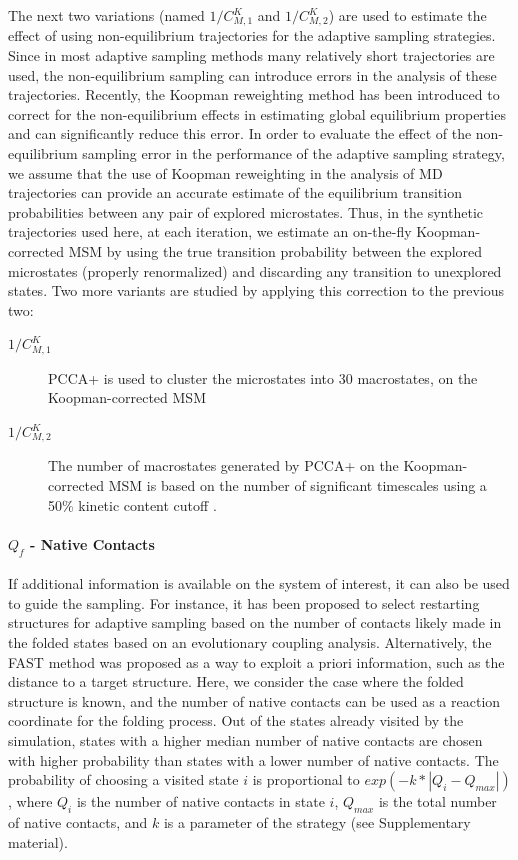 The next two variations (named $1/C_{M,1}^K$ and $1/C_{M,2}^K$) are used to
estimate the effect of using non-equilibrium trajectories for the adaptive sampling
strategies. Since in most adaptive sampling methods many relatively short
trajectories are used, the non-equilibrium sampling can introduce errors in the
analysis of these trajectories.
Recently, the Koopman reweighting method
\cite{koopmanold, koopman2,koopman3,koopman4, wu2017variational, Nueske2017} has been
introduced to correct for the non-equilibrium effects in estimating global
equilibrium properties and can significantly reduce this error. In order to
evaluate the effect of the non-equilibrium sampling error in the performance of
the adaptive sampling strategy, we assume that the use of Koopman reweighting
in the analysis of MD trajectories can provide an accurate estimate of the
equilibrium transition probabilities between any pair of explored microstates.
Thus, in the synthetic trajectories used here, at each iteration, we estimate
an on-the-fly Koopman-corrected MSM by using the true transition probability
between the explored microstates (properly renormalized) and discarding any
transition to unexplored states.  Two more variants are studied by applying this correction to the previous two: 
\begin{description}
\item[$1/C_{M,1}^K$]
PCCA+ is used to cluster the microstates into 30 macrostates, on the Koopman-corrected MSM
\item[$1/C_{M,2}^K$]
The number of macrostates generated by PCCA+ on the Koopman-corrected MSM is
based on the number of significant timescales using a 50\% kinetic content
cutoff \cite{noe2016commute}.
\end{description}

\paragraph{$Q_{f}$ - Native Contacts}
If additional information is available on the system of interest, it can also be used to
guide the sampling. For instance, it has been proposed
\cite{EvolutionCoupling-Shamsi2017} to select restarting structures for
adaptive sampling based on the number of contacts likely made in the folded
states based on an evolutionary coupling analysis. Alternatively, the FAST
method \cite{FAST-Bowman-2015} was proposed as a way to exploit a priori
information, such as the distance to a target structure.  Here, we
consider the case where the folded structure is known, and the number of native
contacts can be used as a reaction coordinate for the folding
process. Out of the states already visited by the simulation, states with a
higher median number of native contacts are chosen with higher probability than
states with a lower number of native contacts. The probability of choosing a
visited state $i$ is proportional to $exp( - k * | Q_i - Q_{max} | )$, where
$Q_i$ is the number of native contacts in state $i$, $Q_{max}$ is the total number of
native contacts, and $k$ is a parameter of the strategy (see Supplementary material).

